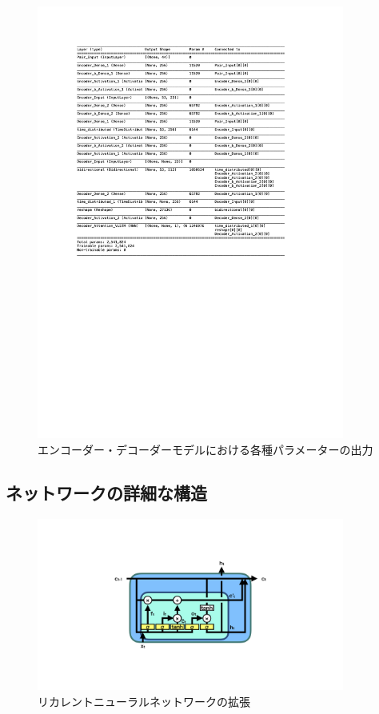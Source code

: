 \begin{figure}[h]
 \centering
 \includegraphics[trim = 75 300 125 0, width=0.9\textwidth]{Figure/3Networks/3-4-1-3VLSTMSummary.png}
 \caption{エンコーダー・デコーダーモデルにおける各種パラメーターの出力}
 \label{3-4-1-3VLSTMSummary}
\end{figure}


\subsection{ネットワークの詳細な構造} \label{Net:VLSTM:DetailedStructureofVLSTM}

\begin{figure}[h]
 \centering
 \includegraphics[trim = 200 200 200 50, width=0.9\textwidth]{Figure/3Networks/3-4-2-1VLSTMStructure.png}
 \caption{リカレントニューラルネットワークの拡張}
 \label{3-4-2-1VLSTMStructure}
\end{figure}

